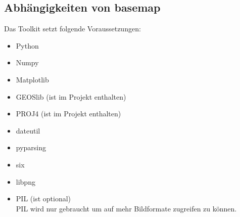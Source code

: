 \subsection[Dependencies]{Abhängigkeiten von basemap}
Das Toolkit setzt folgende Voraussetzungen:
\newline
\begin{itemize}
 \item Python
 \item Numpy
 \item Matplotlib
 \item GEOSlib (ist im Projekt enthalten)
 \item PROJ4 (ist im Projekt enthalten)
 \item dateutil
 \item pyparsing
 \item six
 \item libpng
 \\
 \item PIL (ist optional)\\
 PIL wird nur gebraucht um auf mehr Bildformate zugreifen zu können. 
\end{itemize}

